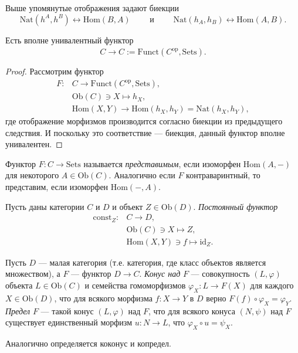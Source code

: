 \documentclass[12pt,a4paper]{article}
\newcommand{\const}{\mathrm{const}}
\newcommand{\op}{\mathrm{op}}
\newcommand{\Hom}{\mathrm{Hom}}
\newcommand{\Ob}{\mathrm{Ob}}
\newcommand{\id}{\mathrm{id}}
\newcommand{\Sets}{\mathrm{Sets}}
\newcommand{\Funct}{\mathrm{Funct}}
\newcommand{\Nat}{\mathrm{Nat}}
\begin{document}
    \begin{corollary}
        Выше упомянутые отображения задают биекции
        \[
            \Nat(h^A, h^B) \leftrightarrow \Hom(B, A)
            \qquad \text{ и } \qquad
            \Nat(h_A, h_B) \leftrightarrow \Hom(A, B).
        \]
    \end{corollary}

    \begin{corollary}
        Есть вполне унивалентный функтор
        \[C \to \widehat{C} := \Funct(C^\op, \Sets).\]
    \end{corollary}

    \begin{proof}
        Рассмотрим функтор
        \begin{align*}
            F: {}
            &C \to \Funct(C^\op, \Sets),\\
            &\Ob(C) \ni X \mapsto h_X,\\
            &\Hom(X, Y) \to \Hom(h_X, h_Y) = \Nat(h_X, h_Y), 
        \end{align*}
        где отображение морфизмов производится согласно биекции из предыдущего следствия. И поскольку это соответствие --- биекция, данный функтор вполне унивалентен.
    \end{proof}

    \begin{definition}
        Функтор $F: C \to \Sets$ называется \emph{представимым}, если изоморфен $\Hom(A, {-})$ для некоторого $A \in \Ob(C)$. Аналогично если $F$ контраваринтный, то представим, если изоморфен $\Hom({-}, A)$.
    \end{definition}

    \begin{definition}
        Пусть даны категории $C$ и $D$ и объект $Z \in \Ob(D)$. \emph{Постоянный функтор}
        \begin{align*}
            \const_Z: {}
            &C \to D,\\
            &\Ob(C) \ni X \mapsto Z,\\
            &\Hom(X, Y) \ni f \mapsto \id_Z. 
        \end{align*}
    \end{definition}

    \begin{definition}
        Пусть $D$ --- малая категория (т.е. категория, где класс объектов является множеством), а $F$ --- функтор $D \to C$. \emph{Конус над} $F$ --- совокупность $(L, \varphi)$ объекта $L \in \Ob(C)$ и семейства гомоморфизмов $\varphi_X: L \to F(X)$ для каждого $X \in \Ob(D)$, что для всякого морфизма $f: X \to Y$ в $D$ верно $F(f) \circ \varphi_X = \varphi_Y$. \emph{Предел} $F$ --- такой конус $(L, \varphi)$ над $F$, что для всякого конуса $(N, \psi)$ над $F$ существует единственный морфизм $u: N \to L$, что $\varphi_X \circ u = \psi_X$.

        Аналогично определяется коконус и копредел.
    \end{definition}
\end{document}
